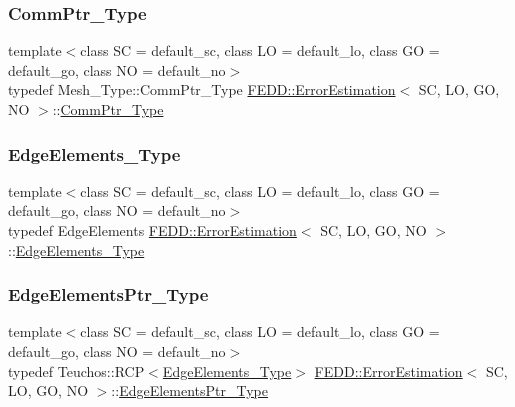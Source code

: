 \subsubsection{\texorpdfstring{Comm\+Ptr\+\_\+\+Type}{CommPtr\_Type}}
{\footnotesize\ttfamily template$<$class SC = default\+\_\+sc, class LO = default\+\_\+lo, class GO = default\+\_\+go, class NO = default\+\_\+no$>$ \\
typedef Mesh\+\_\+\+Type\+::\+Comm\+Ptr\+\_\+\+Type \hyperlink{classFEDD_1_1ErrorEstimation}{F\+E\+D\+D\+::\+Error\+Estimation}$<$ SC, LO, GO, NO $>$\+::\hyperlink{classFEDD_1_1ErrorEstimation_ac5689e70e0c965f5373f2a716c0250c1}{Comm\+Ptr\+\_\+\+Type}}

\mbox{\label{classFEDD_1_1ErrorEstimation_a8014e1e4844351d77d667159034e7523}} 
\subsubsection{\texorpdfstring{Edge\+Elements\+\_\+\+Type}{EdgeElements\_Type}}
{\footnotesize\ttfamily template$<$class SC = default\+\_\+sc, class LO = default\+\_\+lo, class GO = default\+\_\+go, class NO = default\+\_\+no$>$ \\
typedef Edge\+Elements \hyperlink{classFEDD_1_1ErrorEstimation}{F\+E\+D\+D\+::\+Error\+Estimation}$<$ SC, LO, GO, NO $>$\+::\hyperlink{classFEDD_1_1ErrorEstimation_a8014e1e4844351d77d667159034e7523}{Edge\+Elements\+\_\+\+Type}}

\mbox{\label{classFEDD_1_1ErrorEstimation_ac7ab89f64446e4c6e739058240497f04}} 
\subsubsection{\texorpdfstring{Edge\+Elements\+Ptr\+\_\+\+Type}{EdgeElementsPtr\_Type}}
{\footnotesize\ttfamily template$<$class SC = default\+\_\+sc, class LO = default\+\_\+lo, class GO = default\+\_\+go, class NO = default\+\_\+no$>$ \\
typedef Teuchos\+::\+R\+CP$<$\hyperlink{classFEDD_1_1ErrorEstimation_a8014e1e4844351d77d667159034e7523}{Edge\+Elements\+\_\+\+Type}$>$ \hyperlink{classFEDD_1_1ErrorEstimation}{F\+E\+D\+D\+::\+Error\+Estimation}$<$ SC, LO, GO, NO $>$\+::\hyperlink{classFEDD_1_1ErrorEstimation_ac7ab89f64446e4c6e739058240497f04}{Edge\+Elements\+Ptr\+\_\+\+Type}}

